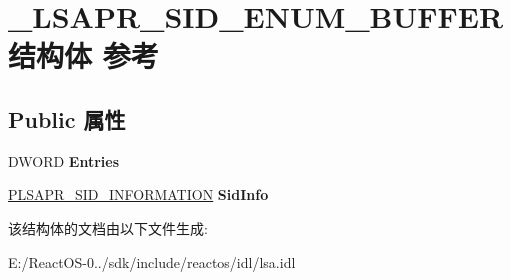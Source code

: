 \hypertarget{struct___l_s_a_p_r___s_i_d___e_n_u_m___b_u_f_f_e_r}{}\section{\+\_\+\+L\+S\+A\+P\+R\+\_\+\+S\+I\+D\+\_\+\+E\+N\+U\+M\+\_\+\+B\+U\+F\+F\+E\+R结构体 参考}
\label{struct___l_s_a_p_r___s_i_d___e_n_u_m___b_u_f_f_e_r}
\subsection*{Public 属性}
\begin{DoxyCompactItemize}
\item 
\mbox{\label{struct___l_s_a_p_r___s_i_d___e_n_u_m___b_u_f_f_e_r_aa11a3325a33ed411340a54407ad3ee2b}} 
D\+W\+O\+RD {\bfseries Entries}
\item 
\mbox{\label{struct___l_s_a_p_r___s_i_d___e_n_u_m___b_u_f_f_e_r_adb4bc271e1e29b2054ca2ecceab3d3a2}} 
\hyperlink{struct___l_s_a_p_r___s_i_d___i_n_f_o_r_m_a_t_i_o_n}{P\+L\+S\+A\+P\+R\+\_\+\+S\+I\+D\+\_\+\+I\+N\+F\+O\+R\+M\+A\+T\+I\+ON} {\bfseries Sid\+Info}
\end{DoxyCompactItemize}


该结构体的文档由以下文件生成\+:\begin{DoxyCompactItemize}
\item 
E\+:/\+React\+O\+S-\/0../sdk/include/reactos/idl/lsa.\+idl\end{DoxyCompactItemize}
